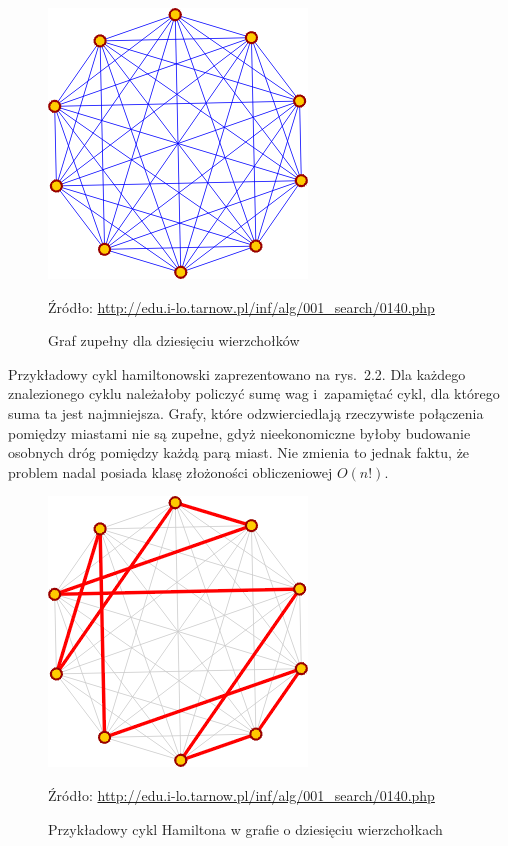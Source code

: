 \documentclass[12pt,a4paper]{report}
\begin{document}
\begin{figure}[!bht]
\centering
\includegraphics[scale=0.5]{Pictures/CompleteGraph.png}
\label{fig: CompleteGraph}
\caption{Graf zupełny dla dziesięciu wierzchołków}{Źródło: \url{http://edu.i-lo.tarnow.pl/inf/alg/001_search/0140.php}}
\end{figure}

Przykładowy cykl hamiltonowski zaprezentowano na rys.~2.2. Dla każdego znalezionego cyklu należałoby policzyć sumę wag i~zapamiętać cykl, dla którego suma ta jest najmniejsza. Grafy, które odzwierciedlają rzeczywiste połączenia pomiędzy miastami nie są zupełne, gdyż nieekonomiczne byłoby budowanie osobnych dróg pomiędzy każdą parą miast. Nie zmienia to jednak faktu, że problem nadal posiada klasę złożoności obliczeniowej $O(n!)$.

\begin{figure}[!bht]
\centering
\includegraphics[scale=0.5]{Pictures/ExampleHamiltonCycle.png}
\label{fig: ExampleHamiltonCycle}
\caption{Przykładowy cykl Hamiltona w grafie o dziesięciu wierzchołkach}{Źródło: \url{http://edu.i-lo.tarnow.pl/inf/alg/001_search/0140.php}}
\end{figure}
\end{document}
